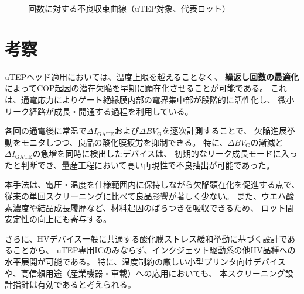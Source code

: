 \documentclass[twocolumn]{ieeetran}
\begin{document}
\begin{figure}[t]
  \centering
  \caption{回数に対する不良収束曲線（uTEP対象、代表ロット）}
  \label{fig_convergence}
\end{figure}

\section{考察}
uTEPヘッド適用においては、温度上限を越えることなく、
\textbf{繰返し回数の最適化}によってCOP起因の潜在欠陥を早期に顕在化させることが可能である。
これは、通電応力によりゲート絶縁膜内部の電界集中部が段階的に活性化し、
微小リーク経路が成長・開通する過程を利用している。

各回の通電後に常温で$\Delta I_\mathrm{GATE}$および$\Delta BV_\mathrm{G}$を逐次計測することで、
欠陥進展挙動をモニタしつつ、良品の酸化膜疲労を抑制できる。
特に、$\Delta BV_\mathrm{G}$の漸減と$\Delta I_\mathrm{GATE}$の急増を同時に検出したデバイスは、
初期的なリーク成長モードに入ったと判断でき、量産工程において高い再現性で不良抽出が可能であった。

本手法は、電圧・温度を仕様範囲内に保持しながら欠陥顕在化を促進する点で、
従来の単回スクリーニングに比べて良品影響が著しく少ない。
また、ウエハ酸素濃度や結晶成長履歴など、材料起因のばらつきを吸収できるため、
ロット間安定性の向上にも寄与する。

さらに、HVデバイス一般に共通する酸化膜ストレス緩和挙動に基づく設計であることから、
uTEP専用ICのみならず、インクジェット駆動系の他HV品種への水平展開が可能である。
特に、温度制約の厳しい小型プリンタ向けデバイスや、高信頼用途（産業機器・車載）への応用においても、
本スクリーニング設計指針は有効であると考えられる。
\end{document}
